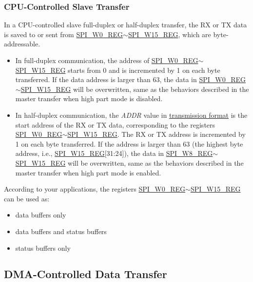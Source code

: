 \documentclass[main\_\_EN.tex]{subfiles}
\begin{document}
\subsubsection{CPU-Controlled Slave Transfer} \label{GP-SPI slave CPU}

In a CPU-controlled slave full-duplex or half-duplex transfer, the RX or TX data is saved to or sent from \hyperref[regdesc:SPIW0REG]{SPI\_W0\_REG}$\sim$\hyperref[regdesc:SPIW15REG]{SPI\_W15\_REG}, which are byte-addressable.

\begin{itemize}
    \item In full-duplex communication, the address of \hyperref[regdesc:SPIW0REG]{SPI\_W0\_REG}$\sim$\hyperref[regdesc:SPIW15REG]{SPI\_W15\_REG} starts from 0 and is incremented by 1 on each byte transferred. If the data address is larger than 63, the data in \hyperref[regdesc:SPIW0REG]{SPI\_W0\_REG}$\sim$\hyperref[regdesc:SPIW15REG]{SPI\_W15\_REG} will be overwritten, same as the behaviors described in the master transfer when high part mode is disabled.
    \item In half-duplex communication, the \emph{ADDR} value in \hyperref[slave communication format]{transmission format} is the start address of the RX or TX data, corresponding to the registers \hyperref[regdesc:SPIW0REG]{SPI\_W0\_REG}$\sim$\hyperref[regdesc:SPIW15REG]{SPI\_W15\_REG}. The RX or TX address is incremented by 1 on each byte transferred. If the address is larger than 63 (the highest byte address, i.e., \hyperref[regdesc:SPIW15REG]{SPI\_W15\_REG}[31:24]), the data in \hyperref[regdesc:SPIW8REG]{SPI\_W8\_REG}$\sim$\hyperref[regdesc:SPIW15REG]{SPI\_W15\_REG} will be overwritten, same as the behaviors described in the master transfer when high part mode is enabled.
\end{itemize}

According to your applications, the registers \hyperref[regdesc:SPIW0REG]{SPI\_W0\_REG}$\sim$\hyperref[regdesc:SPIW15REG]{SPI\_W15\_REG} can be used as:
\begin{itemize}
    \item data buffers only
    \item data buffers and status buffers
    \item status buffers only
\end{itemize}


\subsection{DMA-Controlled Data Transfer}\label{sec:usage-of-gp-spi2-dma-controlled-mode}
\end{document}
